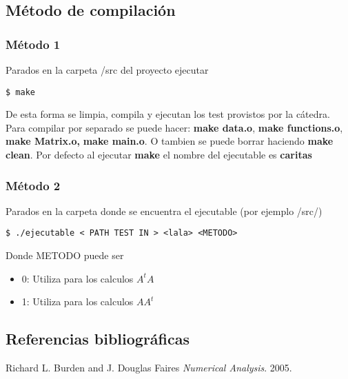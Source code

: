 \subsection{M\'etodo de compilaci\'on}

\subsubsection{M\'etodo 1}
\begin{framed}
Parados en la carpeta /src del proyecto ejecutar 
\begin{verbatim}
$ make
\end{verbatim}
De esta forma se limpia, compila y ejecutan los test provistos por la c\'atedra.
Para compilar por separado se puede hacer:  \textbf{make data.o}, \textbf{make functions.o}, \textbf{make Matrix.o,} \textbf{make main.o}. O tambien se puede borrar haciendo \textbf{make clean}. Por defecto al ejecutar \textbf{make} el nombre del ejecutable es \textbf{caritas}
\end{framed}

\subsubsection{M\'etodo 2}
\begin{framed}
Parados en la carpeta donde se encuentra el ejecutable (por ejemplo /src/) 
\begin{verbatim}
$ ./ejecutable < PATH TEST IN > <lala> <METODO>
\end{verbatim}
Donde METODO puede ser 
\begin{itemize}
	\item 0: Utiliza para los calculos $A^tA$
	\item 1: Utiliza para los calculos $AA^t$
\end{itemize}
\end{framed}




\subsection{Referencias bibliogr\'aficas}
\begin{thebibliography}{9}

  Richard L. Burden and J. Douglas Faires
  \emph{Numerical Analysis}.
  2005.
\end{thebibliography}
